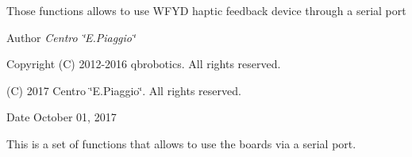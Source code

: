 Those functions allows to use W\+F\+YD haptic feedback device through a serial port\begin{DoxyAuthor}{Author}
{\itshape Centro \char`\"{}\+E.\+Piaggio\char`\"{}} 
\end{DoxyAuthor}
\begin{DoxyCopyright}{Copyright}
(C) 2012-\/2016 qbrobotics. All rights reserved. 

(C) 2017 Centro \char`\"{}\+E.\+Piaggio\char`\"{}. All rights reserved.
\end{DoxyCopyright}
\begin{DoxyDate}{Date}
October 01, 2017
\end{DoxyDate}
This is a set of functions that allows to use the boards via a serial port. 
